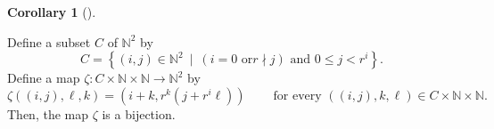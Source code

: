 \documentclass[numbers=enddot,12pt,final,onecolumn,notitlepage]{scrartcl}%
\theoremstyle{definition}
\newtheorem{coro}[theo]{Corollary}
\newenvironment{corollary}[1][]
{\begin{coro}[#1]\begin{leftbar}}
{\end{leftbar}\end{coro}}
\begin{document}
\begin{corollary}
\label{cor.F-gen.bases.f.1.cor2}Define a subset $C$ of $\mathbb{N}^{2}$ by%
\begin{equation}
C=\left\{  \left(  i,j\right)  \in\mathbb{N}^{2}\ \mid\ \left(  i=0\text{ or
}r\nmid j\right)  \text{ and }0\leq j<r^{i}\right\}  .
\label{eq.cor.F-gen.bases.f.1.cor2.def-C}%
\end{equation}
Define a map $\zeta:C\times\mathbb{N}\times\mathbb{N}\rightarrow\mathbb{N}%
^{2}$ by%
\begin{equation}
\zeta\left(  \left(  i,j\right)  ,\ell,k\right)  =\left(  i+k,r^{k}\left(
j+r^{i}\ell\right)  \right)  \ \ \ \ \ \ \ \ \ \ \text{for every }\left(
\left(  i,j\right)  ,k,\ell\right)  \in C\times\mathbb{N}\times\mathbb{N}.
\label{eq.cor.F-gen.bases.f.1.cor2.def-zeta}%
\end{equation}
Then, the map $\zeta$ is a bijection.
\end{corollary}
\end{document}
